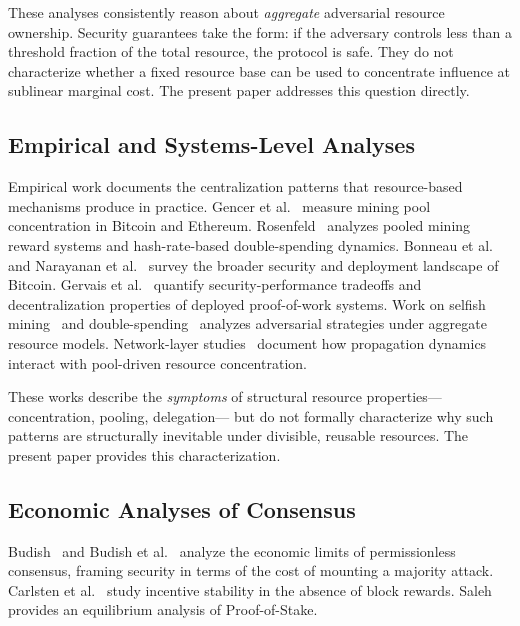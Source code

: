 \documentclass[10pt,journal,compsoc]{IEEEtran}
\theoremstyle{remark}
\begin{document}
	These analyses consistently reason about
	\emph{aggregate} adversarial resource ownership.
	Security guarantees take the form: if the adversary
	controls less than a threshold fraction of the total
	resource, the protocol is safe.
	They do not characterize whether a fixed resource base
	can be used to concentrate influence at sublinear
	marginal cost.
	The present paper addresses this question directly.
	
	\subsection{Empirical and Systems-Level Analyses}
	\label{ssec:rw_empirical}
	
	Empirical work documents the centralization patterns
	that resource-based mechanisms produce in practice.
	Gencer et al.~\cite{gencer2018decentralization} measure
	mining pool concentration in Bitcoin and Ethereum.
	Rosenfeld~\cite{rosenfeld2011analysis,rosenfeld2014analysis}
	analyzes pooled mining reward systems and hash-rate-based
	double-spending dynamics.
	Bonneau et al.~\cite{bonneau2015sok} and
	Narayanan et al.~\cite{narayanan2016bitcoinbook} survey
	the broader security and deployment landscape of Bitcoin.
	Gervais et al.~\cite{gervais2016security,gervais2014isbitcoin}
	quantify security-performance tradeoffs and decentralization
	properties of deployed proof-of-work systems.
	Work on selfish mining~\cite{eyal2014majority} and
	double-spending~\cite{kroll2013economics} analyzes
	adversarial strategies under aggregate resource models.
	Network-layer studies~\cite{neudecker2019network} document
	how propagation dynamics interact with pool-driven
	resource concentration.
	
	These works describe the \emph{symptoms} of structural
	resource properties---concentration, pooling, delegation---
	but do not formally characterize why such patterns are
	structurally inevitable under divisible, reusable resources.
	The present paper provides this characterization.
	
	\subsection{Economic Analyses of Consensus}
	\label{ssec:rw_economic}
	
	Budish~\cite{budish2018economic} and
	Budish et al.~\cite{budish2024economic} analyze the
	economic limits of permissionless consensus, framing
	security in terms of the cost of mounting a majority attack.
	Carlsten et al.~\cite{carlsten2016instability} study
	incentive stability in the absence of block rewards.
	Saleh~\cite{saleh2021blockchain} provides an equilibrium
	analysis of Proof-of-Stake.
	
\end{document}
